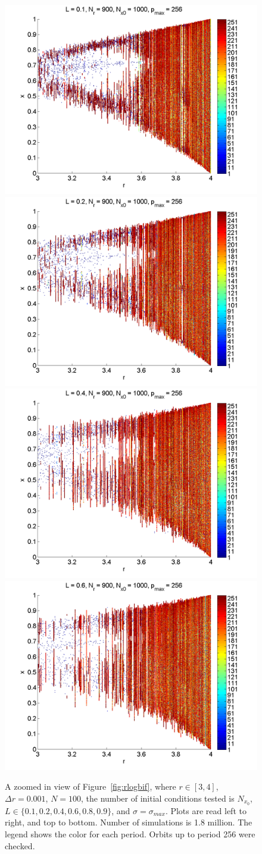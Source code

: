 \begin{figure}[H]\linespread{1}
\caption[Bifurcation diagram of the random logistic map, $\sigma=\sigma_{max}$, zoomed
in]{A zoomed in view of Figure~\ref{fig:rlogbif}, where $r \in
  [3,4]$, $\Delta r = 0.001$, $N=100$, the number of initial
  conditions tested is $N_{x_0}$, $L\in \{0.1,0.2,0.4,0.6,0.8,0.9\}$,
  and $\sigma=\sigma_{max}$. Plots are read left to right, and top to
bottom. Number of simulations is 1.8 million. The legend shows the color for each period. Orbits up to period 256 were checked.}\label{fig:rlogbif_zoom}
	\begin{center}
		\includegraphics[width=.5\textwidth]{figs/rlog_bif_zoom_L_01.png}\hfill
		\includegraphics[width=.5\textwidth]{figs/rlog_bif_zoom_L_02.png}\\
		\includegraphics[width=.5\textwidth]{figs/rlog_bif_zoom_L_04.png}\hfill
		\includegraphics[width=.5\textwidth]{figs/rlog_bif_zoom_L_06.png}\\

\end{center}
\end{figure}
